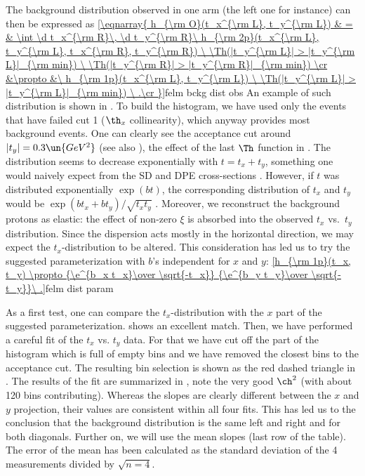 The background distribution observed in one arm (the left one for instance) can then be expressed as
\eqref{\eqnarray{
h_{\rm O}(t_x^{\rm L}, t_y^{\rm L}) & = &
\int \d t_x^{\rm R}\, \d t_y^{\rm R}\ h_{\rm 2p}(t_x^{\rm L}, t_y^{\rm L}, t_x^{\rm R}, t_y^{\rm R})
	\ \Th(|t_y^{\rm L}| > |t_y^{\rm L}|_{\rm min})
	\ \Th(|t_y^{\rm R}| > |t_y^{\rm R}|_{\rm min})
\cr
&\propto &\ h_{\rm 1p}(t_x^{\rm L}, t_y^{\rm L})
	\ \Th(|t_y^{\rm L}| > |t_y^{\rm L}|_{\rm min})
\ .\cr
}}{felm bckg dist obs}
An example of such distribution is shown in . To build the histogram, we have used only the events that have failed cut 1 ($\th_x$ collinearity), which anyway provides most background events. One can clearly see the acceptance cut around $|t_y| = 0.3\un{GeV^2}$ (see also ), the effect of the last $\Th$ function in . The distribution seems to decrease exponentially with $t = t_x + t_y$, something one would naively expect from the SD and DPE cross-sections . However, if $t$ was distributed exponentially $\exp(b t)$, the corresponding distribution of $t_x$ and $t_y$ would be $\exp(b t_x + b t_y)/\sqrt{t_x t_y}$
. Moreover, we reconstruct the background protons as elastic: the effect of non-zero $\xi$ is absorbed into the observed $t_x$ vs.~$t_y$ distribution. Since the dispersion acts mostly in the horizontal direction, we may expect the $t_x$-distribution to be altered. This consideration has led us to try the suggested parameterization with $b$'s independent for $x$ and $y$:
\eqref{h_{\rm 1p}(t_x, t_y) \propto {\e^{b_x t_x}\over \sqrt{-t_x}} {\e^{b_y t_y}\over \sqrt{-t_y}}\ .}{felm dist param}

As a first test, one can compare the $t_x$-distribution with the $x$ part of the suggested parameterization.  shows an excellent match. Then, we have performed a careful fit of the $t_x$ vs. $t_y$ data. For that we have cut off the part of the histogram which is full of empty bins and we have removed the closest bins to the acceptance cut. The resulting bin selection is shown as the red dashed triangle in . The results of the fit are summarized in , note the very good $\ch^2$ (with about 120 bins contributing). Whereas the slopes are clearly different between the $x$ and $y$ projection, their values are consistent within all four fits. This has led us to the conclusion that the background distribution is the same left and right and for both diagonals. Further on, we will use the mean slopes (last row of the table). The error of the mean has been calculated as the standard deviation of the 4 measurements divided by $\sqrt{n = 4}$.

